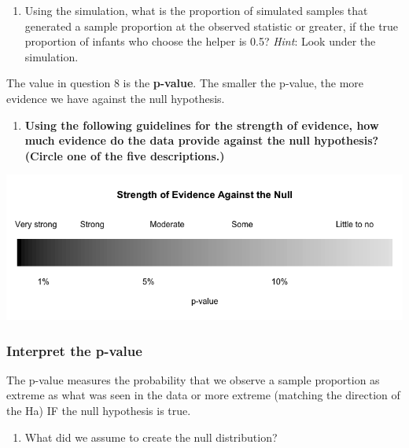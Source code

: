 \documentclass[
]{report}
\providecommand{\tightlist}{%
  \setlength{\itemsep}{0pt}\setlength{\parskip}{0pt}}
\begin{document}
\newpage

\begin{enumerate}
\def\labelenumi{\arabic{enumi}.}
\setcounter{enumi}{7}
\tightlist
\item
  Using the simulation, what is the proportion of simulated samples that generated a sample proportion at the observed statistic or greater, if the true proportion of infants who choose the helper is 0.5? \emph{Hint}: Look under the simulation.
\end{enumerate}

\vspace{1in}

The value in question 8 is the \textbf{p-value}. The smaller the p-value, the more evidence we have against the null hypothesis.

\begin{enumerate}
\def\labelenumi{\arabic{enumi}.}
\setcounter{enumi}{8}
\tightlist
\item
  \textbf{Using the following guidelines for the strength of evidence, how much evidence do the data provide against the null hypothesis? (Circle one of the five descriptions.)}
\end{enumerate}

\begin{center}\includegraphics[width=0.9\linewidth]{images/soe_gradient_grayscale} \end{center}

\hypertarget{interpret-the-p-value}{%
\subsubsection*{Interpret the p-value}\label{interpret-the-p-value}}

The p-value measures the probability that we observe a sample proportion as extreme as what was seen in the data or more extreme (matching the direction of the Ha) IF the null hypothesis is true.

\begin{enumerate}
\def\labelenumi{\arabic{enumi}.}
\setcounter{enumi}{9}
\tightlist
\item
  What did we assume to create the null distribution?
\end{enumerate}
\end{document}
